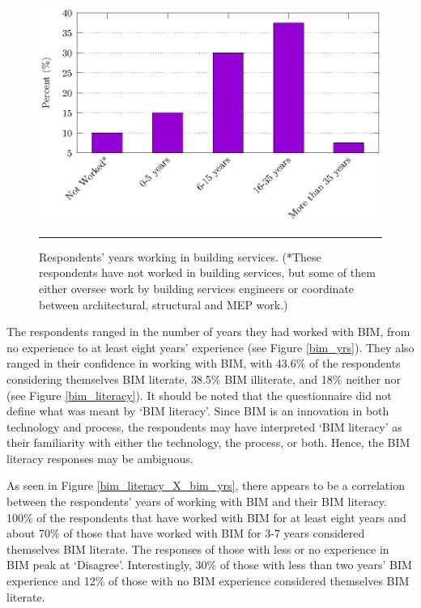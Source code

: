 \begin{figure}[htbp]
	\centering
	\includegraphics[width=\textwidth]{figures/Yrs-in-BS.eps}
	\rule{\textwidth}{0.5pt} %
	\caption[Respondents' years working in building services.]{Respondents' years working in building services. (*These respondents have not worked in building services, but some of them either oversee work by building services engineers or coordinate between architectural, structural and MEP work.)}
	\label{bs_yrs}
\end{figure}

The respondents ranged in the number of years they had worked with BIM, from no experience to at least eight years' experience (see Figure \ref{bim_yrs}).
They also ranged in their confidence in working with BIM, with 43.6\% of the respondents considering themselves BIM literate, 38.5\% BIM illiterate, and 18\% neither nor (see Figure \ref{bim_literacy}).
It should be noted that the questionnaire did not define what was meant by `BIM literacy'.
Since BIM is an innovation in both technology and process, the respondents may have interpreted `BIM literacy' as their familiarity with either the technology, the process, or both.
Hence, the BIM literacy responses may be ambiguous.

As seen in Figure \ref{bim_literacy_X_bim_yrs}, there appears to be a correlation between the respondents' years of working with BIM and their BIM literacy.
100\% of the respondents that have worked with BIM for at least eight years and about 70\% of those that have worked with BIM for 3-7 years considered themselves BIM literate.
The responses of those with less or no experience in BIM peak at `Disagree'.
Interestingly, 30\% of those with less than two years' BIM experience and 12\% of those with no BIM experience considered themselves BIM literate.

